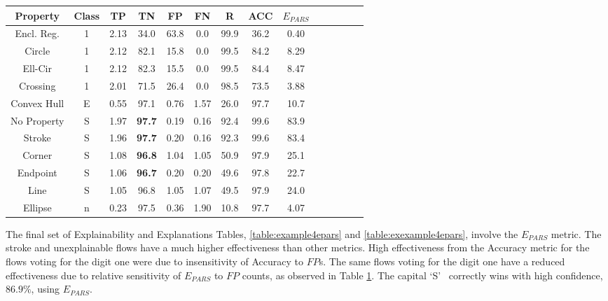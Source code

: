 \begin{table}[H]
    \renewcommand{\arraystretch}{1.3}
    \label{table:example4eff_metrics} 
    \centering
    \begin{tabular}{| c | c | c | c | c | c | c | c | c | c | c | c | c | c |}
    \hline
    Property & Class & TP & TN & FP & FN & R & ACC & $E_{PARS}$ \\
    \hline
    \hline
    Encl. Reg. & 1 & 2.13 & 34.0 & 63.8 & 0.0 & 99.9 & 36.2 & 0.40 \\ 
    \hline
    Circle & 1 & 2.12 & 82.1 & 15.8 & 0.0 & 99.5 & 84.2 &  8.29 \\
    \hline
    Ell-Cir & 1 & 2.12 & 82.3 & 15.5 & 0.0 & 99.5 & 84.4 & 8.47 \\
    \hline
    Crossing & 1 & 2.01 & 71.5 & 26.4 & 0.0 & 98.5 & 73.5 & 3.88 \\
    \hline
    Convex Hull & E & 0.55 & 97.1 & 0.76 & 1.57 & 26.0 & 97.7 & 10.7 \\
    \hline
    No Property & S & 1.97 & \bf{97.7} & 0.19 & 0.16 & 92.4 & 99.6 & 83.9 \\
    \hline
    Stroke & S & 1.96 & \bf{97.7} & 0.20 & 0.16 & 92.3 & 99.6 & 83.4 \\
    \hline
    Corner & S & 1.08 & \bf{96.8} & 1.04 & 1.05 & 50.9 & 97.9 & 25.1 \\
    \hline
    Endpoint & S & 1.06 & \bf{96.7} & 0.20 & 0.20 & 49.6 & 97.8 & 22.7 \\
    \hline
    Line & S & 1.05 & 96.8 & 1.05 & 1.07 & 49.5 & 97.9 & 24.0 \\
    \hline
    Ellipse & n & 0.23 & 97.5 & 0.36 & 1.90 & 10.8 & 97.7 & 4.07 \\
    \hline
    \end{tabular}
\end{table}

The final set of Explainability and Explanations Tables,
\ref{table:example4epars} and \ref{table:exexample4epars}, involve the
$E_{PARS}$ metric. The stroke and unexplainable flows have a much higher
effectiveness than other metrics.  High effectiveness from the Accuracy
metric for the flows voting for the digit one were due to insensitivity of
Accuracy to $FP$s.  The same flows voting for the digit one have a reduced
effectiveness due to relative sensitivity of $E_{PARS}$ to $FP$ counts, as
observed in Table \ref{table:example4eff_metrics}.  The capital \lq{S}\rq~
correctly wins with high confidence, $86.9\%$, using $E_{PARS}$.


